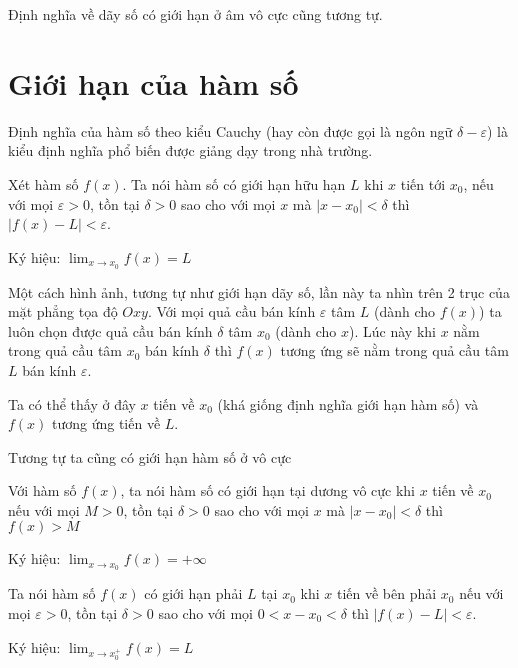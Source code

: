 Định nghĩa về dãy số có giới hạn ở âm vô cực cũng tương tự.

\section{Giới hạn của hàm số}

Định nghĩa của hàm số theo kiểu Cauchy (hay còn được gọi là
ngôn ngữ $\delta-\varepsilon$) là kiểu định nghĩa phổ biến được
giảng dạy trong nhà trường.

\begin{definition}
    Xét hàm số $f(x)$. Ta nói hàm số có giới hạn hữu hạn $L$
    khi $x$ tiến tới $x_0$, nếu với mọi $\varepsilon > 0$, tồn tại 
    $\delta > 0$ sao cho với mọi $x$ mà $| x - x_0 | < \delta$ thì
    $|f(x) - L| < \varepsilon$.

    Ký hiệu: $\displaystyle{\lim_{x \to x_0} f(x) = L}$
\end{definition}

Một cách hình ảnh, tương tự như giới hạn dãy số, lần này ta nhìn trên 2 trục 
của mặt phẳng tọa độ $Oxy$. Với mọi quả cầu bán kính $\varepsilon$ tâm $L$ (dành cho $f(x)$)
ta luôn chọn được quả cầu bán kính $\delta$ tâm $x_0$ (dành cho $x$). Lúc này khi $x$
nằm trong quả cầu tâm $x_0$ bán kính $\delta$ thì $f(x)$ tương ứng sẽ nằm trong quả cầu
tâm $L$ bán kính $\varepsilon$.

Ta có thể thấy ở đây $x$ tiến về $x_0$ (khá giống định nghĩa giới hạn hàm số)
và $f(x)$ tương ứng tiến về $L$.

Tương tự ta cũng có giới hạn hàm số ở vô cực

\begin{definition}
    Với hàm số $f(x)$, ta nói hàm số có giới hạn tại dương vô cực
    khi $x$ tiến về $x_0$ nếu với mọi $M > 0$, tồn tại $\delta > 0$ sao cho với mọi $x$ mà $|x - x_0| < \delta$ 
    thì $f(x) > M$

    Ký hiệu: $\displaystyle{\lim_{x \to x_0} f(x) = +\infty}$
\end{definition}

\begin{definition}
    Ta nói hàm số $f(x)$ có giới hạn phải $L$ tại $x_0$ khi $x$ tiến về bên phải $x_0$
    nếu với mọi $\varepsilon > 0$, tồn tại $\delta > 0$ sao cho với mọi $0 < x - x_0 < \delta$ 
    thì $|f(x) - L| < \varepsilon$.

    Ký hiệu: $\displaystyle{\lim_{x \to x_0^+} f(x) = L}$
\end{definition}

